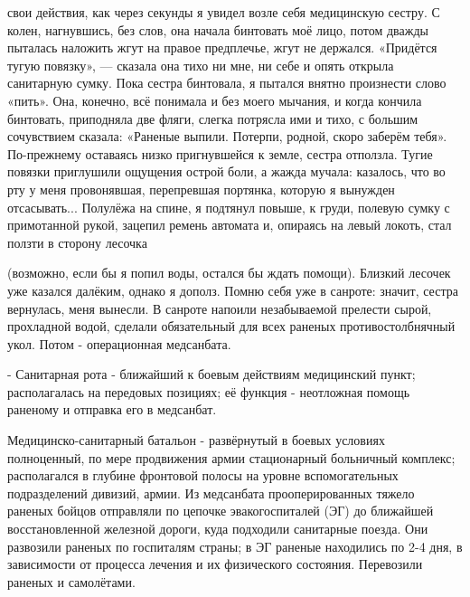 \label{11-1}
свои действия, как через секунды я увидел возле себя медицинскую сестру. С колен, нагнувшись, без слов, она начала бинтовать моё лицо, потом дважды пыталась наложить жгут на правое предплечье, жгут не держался. «Придётся тугую повязку», — сказала она тихо ни мне, ни себе и опять открыла санитарную сумку. Пока сестра бинтовала, я пытался внятно произнести слово «пить». Она, конечно, всё понимала и без моего мычания, и когда кончила бинтовать, приподняла две фляги, слегка потрясла ими и тихо, с большим сочувствием сказала: «Раненые выпили. Потерпи, родной, скоро заберём тебя». По-прежнему оставаясь низко пригнувшейся к земле, сестра отползла. Тугие повязки приглушили ощущения острой боли, а жажда мучала: казалось, что во рту у меня провонявшая, перепревшая портянка, которую я вынужден отсасывать... Полулёжа на спине, я подтянул повыше, к груди, полевую сумку с примотанной рукой, зацепил ремень автомата и, опираясь на левый локоть, стал ползти в сторону лесочка

\label{12-1}
 (возможно, если бы я попил воды, остался бы ждать помощи). Близкий лесочек уже казался далёким, однако я дополз. Помню себя уже в санроте: значит, сестра вернулась, меня вынесли. В санроте напоили незабываемой прелести сырой, прохладной водой, сделали обязательный для всех раненых противостолбнячный укол. Потом - операционная медсанбата.

\label{12-2}
- Санитарная рота - ближайший к боевым действиям медицинский пункт; располагалась на передовых позициях; её функция - неотложная помощь раненому и отправка его в медсанбат.

\label{12-3}
Медицинско-санитарный батальон - развёрнутый в боевых условиях полноценный, по мере продвижения армии стационарный больничный комплекс; располагался в глубине фронтовой полосы на уровне вспомогательных подразделений дивизий, армии. Из медсанбата прооперированных тяжело раненых бойцов отправляли по цепочке эвакогоспиталей (ЭГ) до ближайшей восстановленной железной дороги, куда подходили санитарные поезда. Они развозили раненых по госпиталям страны; в ЭГ раненые находились по 2-4 дня, в зависимости от процесса лечения и их физического состояния. Перевозили раненых и самолётами.

